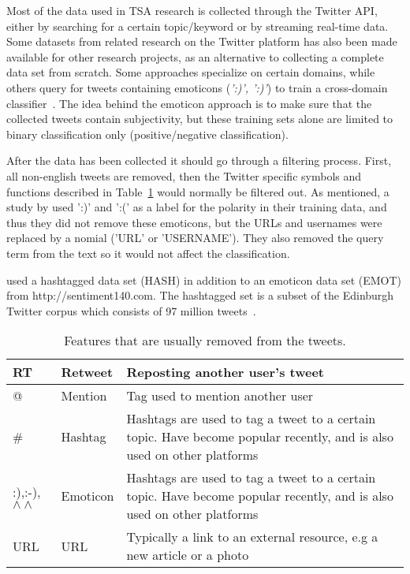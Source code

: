 Most of the data used in TSA research is collected through the Twitter API, either by searching for a certain topic/keyword or by streaming real-time data. Some datasets from related research on the Twitter platform has also been made available for other research projects, as an alternative to collecting a complete data set from scratch. Some approaches specialize on certain domains, while others query for tweets containing emoticons (\emph{':)', ':)'}) to train a cross-domain classifier~\citep{article:go}. The idea behind the emoticon approach is to make sure that the collected tweets contain subjectivity, but these training sets alone are limited to binary classification only (positive/negative classification).

After the data has been collected it should go through a filtering process. First, all non-english tweets are removed, then the Twitter specific symbols and functions described in Table~\ref{tab:features} would normally be filtered out. As mentioned, a study by \cite{article:go} used ':)' and ':(' as a label for the polarity in their training data, and thus they did not remove these emoticons, but the URLs and usernames were replaced by a nomial ('URL' or 'USERNAME'). They also removed the query term from the text so it would not affect the classification.

\cite{article:omg} used a hashtagged data set (HASH) in addition to an emoticon data set (EMOT) from http://sentiment140.com. The hashtagged set is a subset of the Edinburgh Twitter corpus which consists of 97 million tweets~\citep{article:edinburgh}.

\begin{table}[]
\centering
\begin{tabular}{|l|l|p{8cm}|}
\hline
RT & Retweet & Reposting another user’s tweet \\ \hline
@ & Mention & Tag used to mention another user \\ \hline
\# & Hashtag & Hashtags are used to tag a tweet to a certain topic. Have become popular recently, and is also used on other platforms \\ \hline
:),:-),$\wedge\wedge$ & Emoticon & Hashtags are used to tag a tweet to a certain topic. Have become popular recently, and is also used on other platforms \\ \hline
URL & URL & Typically a link to an external resource, e.g a new article or a photo \\ \hline
\end{tabular}
\label{tab:features}
\caption{Features that are usually removed from the tweets.}
\end{table}

